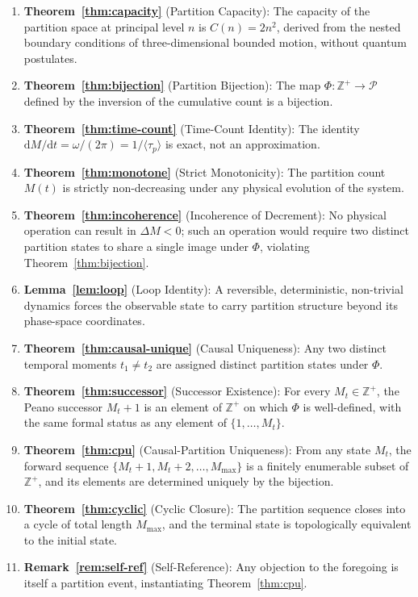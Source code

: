 \documentclass[twocolumn,10pt,a4paper]{article}
\theoremstyle{thmstyle}
\theoremstyle{definition}
\theoremstyle{remark}
\newcommand{\Zp}{\mathbb{Z}^{+}}
\newcommand{\Parts}{\mathcal{P}}
\newcommand{\tp}{\langle\tau_{p}\rangle}
\newcommand{\dM}{\mathrm{d}M}
\newcommand{\dt}{\mathrm{d}t}
\newcommand{\Mmax}{M_{\max}}
\newcommand{\PhiMap}{\varPhi}
\begin{document}
\begin{enumerate}[leftmargin=1.5em,itemsep=0.2em]
\item \textbf{Theorem~\ref{thm:capacity}} (Partition Capacity): The capacity of the partition space at principal level $n$ is $C(n) = 2n^2$, derived from the nested boundary conditions of three-dimensional bounded motion, without quantum postulates.

\item \textbf{Theorem~\ref{thm:bijection}} (Partition Bijection): The map $\PhiMap : \Zp \to \Parts$ defined by the inversion of the cumulative count is a bijection.

\item \textbf{Theorem~\ref{thm:time-count}} (Time-Count Identity): The identity $\dM/\dt = \omega/(2\pi) = 1/\tp$ is exact, not an approximation.

\item \textbf{Theorem~\ref{thm:monotone}} (Strict Monotonicity): The partition count $M(t)$ is strictly non-decreasing under any physical evolution of the system.

\item \textbf{Theorem~\ref{thm:incoherence}} (Incoherence of Decrement): No physical operation can result in $\Delta M < 0$; such an operation would require two distinct partition states to share a single image under $\PhiMap$, violating Theorem~\ref{thm:bijection}.

\item \textbf{Lemma~\ref{lem:loop}} (Loop Identity): A reversible, deterministic, non-trivial dynamics forces the observable state to carry partition structure beyond its phase-space coordinates.

\item \textbf{Theorem~\ref{thm:causal-unique}} (Causal Uniqueness): Any two distinct temporal moments $t_1 \neq t_2$ are assigned distinct partition states under $\PhiMap$.

\item \textbf{Theorem~\ref{thm:successor}} (Successor Existence): For every $M_t \in \Zp$, the Peano successor $M_t + 1$ is an element of $\Zp$ on which $\PhiMap$ is well-defined, with the same formal status as any element of $\{1, \ldots, M_t\}$.

\item \textbf{Theorem~\ref{thm:cpu}} (Causal-Partition Uniqueness): From any state $M_t$, the forward sequence $\{M_t + 1, M_t + 2, \ldots, \Mmax\}$ is a finitely enumerable subset of $\Zp$, and its elements are determined uniquely by the bijection.

\item \textbf{Theorem~\ref{thm:cyclic}} (Cyclic Closure): The partition sequence closes into a cycle of total length $\Mmax$, and the terminal state is topologically equivalent to the initial state.

\item \textbf{Remark~\ref{rem:self-ref}} (Self-Reference): Any objection to the foregoing is itself a partition event, instantiating Theorem~\ref{thm:cpu}.
\end{enumerate}
\end{document}
